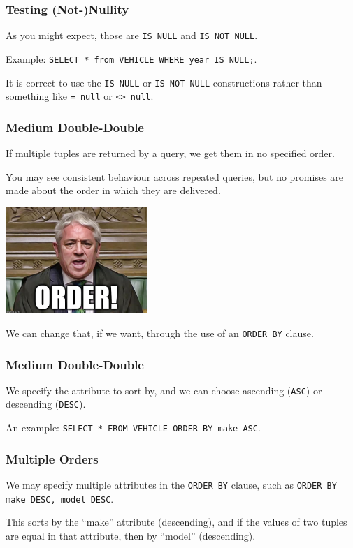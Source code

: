 \begin{frame}
\frametitle{Testing (Not-)Nullity}

As you might expect, those are \texttt{IS NULL} and \texttt{IS NOT NULL}. 


Example: \texttt{SELECT * from VEHICLE WHERE year IS NULL;}.

It is correct to use the \texttt{IS NULL} or \texttt{IS NOT NULL} constructions rather than something like \texttt{= null} or \texttt{<> null}.

\end{frame}



\begin{frame}
\frametitle{Medium Double-Double}

If multiple tuples are returned by a query, we get them in no specified order. 

You may see consistent behaviour across repeated queries, but no promises are made about the order in which they are delivered. 


\begin{center}
	\includegraphics[width=0.4\textwidth]{images/order.jpg}
\end{center}

We can change that, if we want, through the use of an \texttt{ORDER BY} clause. 

\end{frame}



\begin{frame}
\frametitle{Medium Double-Double}


We specify the attribute to sort by, and we can choose ascending (\texttt{ASC}) or descending (\texttt{DESC}). 

An example: \texttt{SELECT * FROM VEHICLE ORDER BY make ASC}.

\end{frame}



\begin{frame}
\frametitle{Multiple Orders}

We may specify multiple attributes in the \texttt{ORDER BY} clause, such as \texttt{ORDER BY make DESC, model DESC}. 

This sorts by the ``make'' attribute (descending), and if the values of two tuples are equal in that attribute, then by ``model'' (descending). 


\end{frame}



